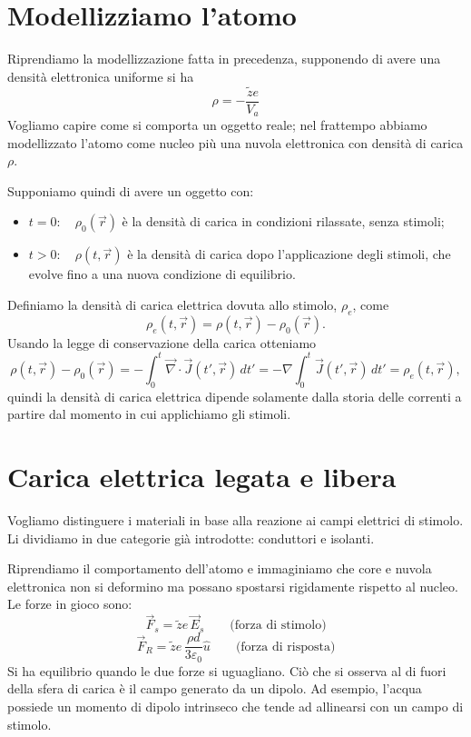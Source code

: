 \documentclass{book}
\begin{document}
\section{Modellizziamo l'atomo}

Riprendiamo la modellizzazione fatta in precedenza,
supponendo di avere una densit\`a elettronica uniforme si ha
\[
\rho = -\frac{\tilde{z}e}{V_a}
\]
Vogliamo capire come si comporta un oggetto reale; nel frattempo abbiamo modellizzato l'atomo come nucleo pi\`u una nuvola elettronica con densit\`a di carica $\rho$.

Supponiamo quindi di avere un oggetto con:
\begin{itemize}
    \item $t=0:\quad \rho_0(\vec{r})$ \`e la densit\`a di carica in condizioni rilassate, senza stimoli;
    \item $t>0:\quad \rho(t,\vec{r})$ \`e la densit\`a di carica dopo l'applicazione degli stimoli, che evolve fino a una nuova condizione di equilibrio.
\end{itemize}

Definiamo la densit\`a di carica elettrica dovuta allo stimolo, $\rho_e$, come
\[
\rho_e(t,\vec{r}) = \rho(t,\vec{r}) - \rho_0(\vec{r}).
\]
Usando la legge di conservazione della carica otteniamo
\[
\rho(t,\vec{r}) - \rho_0(\vec{r}) = -\int_0^t \vec{\nabla}\cdot\vec{J}(t',\vec{r})\,dt' = -\nabla\int_0^t \vec{J}(t',\vec{r})\,dt' = \rho_e(t,\vec{r}),
\]
quindi la densit\`a di carica elettrica dipende solamente dalla storia delle correnti a partire dal momento in cui applichiamo gli stimoli.

\section{Carica elettrica legata e libera}

Vogliamo distinguere i materiali in base alla reazione ai campi elettrici di stimolo. Li dividiamo in due categorie già introdotte: conduttori e isolanti.

Riprendiamo il comportamento dell'atomo e immaginiamo che core e nuvola elettronica non si deformino ma possano spostarsi rigidamente rispetto al nucleo. Le forze in gioco sono:
\[
\vec{F}_s = \tilde{z} e\, \vec{E}_s \qquad\text{(forza di stimolo)}
\]
\[
\vec{F}_R = \tilde{z} e\,\frac{\rho d}{3\varepsilon_0}\hat{u} \qquad\text{(forza di risposta)}
\]
Si ha equilibrio quando le due forze si uguagliano. Ci\`o che si osserva al di fuori della sfera di carica \`e il campo generato da un dipolo. Ad esempio, l'acqua possiede un momento di dipolo intrinseco che tende ad allinearsi con un campo di stimolo.
\end{document}

